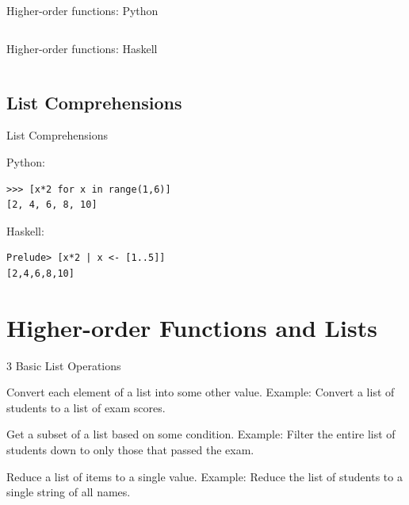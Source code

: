 \documentclass{beamer}
\begin{document}
\begin{frame}{Higher-order functions: Python}

  \inputminted[firstline=3,lastline=10]{python}{code/higher_order.py}

\end{frame}

\begin{frame}{Higher-order functions: Haskell}

  \inputminted[lastline=5]{haskell}{code/higher_order.hs}

\end{frame}


\subsection{List Comprehensions}

\begin{frame}[fragile]{List Comprehensions}

Python:
  \begin{verbatim}
>>> [x*2 for x in range(1,6)]
[2, 4, 6, 8, 10]
  \end{verbatim}

Haskell:
  \begin{verbatim}
Prelude> [x*2 | x <- [1..5]]
[2,4,6,8,10]
  \end{verbatim}

\end{frame}

\section{Higher-order Functions and Lists}

\begin{frame}{3 Basic List Operations}

  \begin{description}[<+->]
  \item[Map] Convert each element of a list into some other value.
    Example: Convert a list of students to a list of exam scores.
  \item[Filter] Get a subset of a list based on some condition.
    Example: Filter the entire list of students down to only those
    that passed the exam.
  \item[Fold] Reduce a list of items to a single value.
    Example: Reduce the list of students to a single string of all
    names.
  \end{description}

\end{frame}
\end{document}
